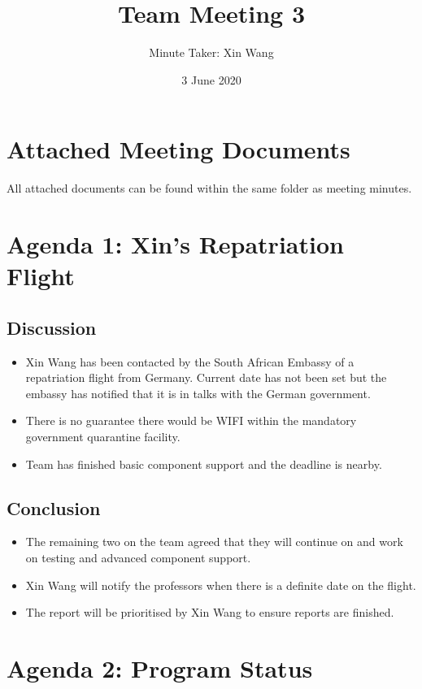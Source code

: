 \documentclass[a4paper]{article}
\author{Minute Taker: Xin Wang}
\title{Team Meeting 3}
\date{3 June 2020}
\begin{document}
\maketitle
\section{Attached Meeting Documents} 
All attached documents can be found within the same folder as meeting minutes. 
\maketitle
\section{Agenda 1: Xin's Repatriation Flight} 
\subsection{Discussion}
\begin{itemize}
    \item Xin Wang has been contacted by the South African Embassy of a repatriation flight
    from Germany. Current date has not been set but the embassy has notified 
    that it is in talks with the German government.
    \item There is no guarantee there would be WIFI within the mandatory government 
    quarantine facility. 
    \item Team has finished basic component support and the deadline is nearby.
\end{itemize}
\subsection{Conclusion}
\begin{itemize}
    \item The remaining two on the team agreed that they will continue on and work 
    on testing and advanced component support.
    \item Xin Wang will notify the professors when there is a definite date on the flight.
    \item The report will be prioritised by Xin Wang to ensure reports are finished.
\end{itemize}

\section{Agenda 2: Program Status} 
\end{document}
